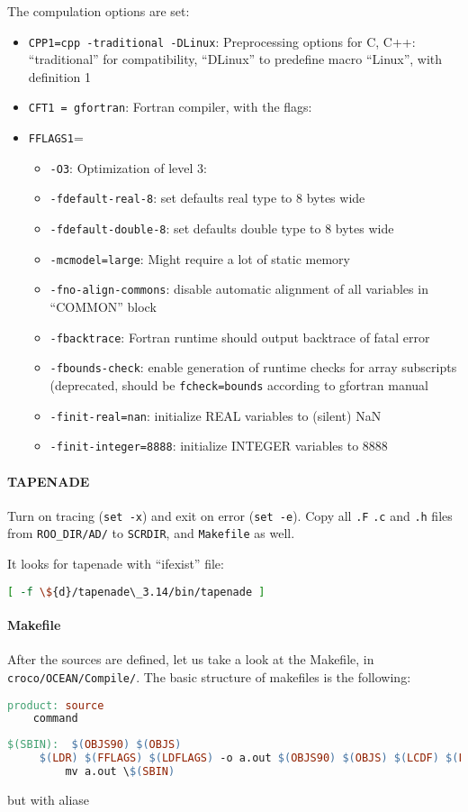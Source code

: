 \message{ !name(croco.tex)}\documentclass{article}
\begin{document}
The compulation options are set:
\begin{itemize}
\item \texttt{CPP1=cpp -traditional -DLinux}: Preprocessing options for C, C++: ``traditional'' for compatibility, ``DLinux'' to predefine macro ``Linux'', with definition 1
\item \texttt{CFT1 = gfortran}: Fortran compiler, with the flags:
\item \texttt{FFLAGS1}=
  \begin{itemize}
  \item \texttt{-O3}: Optimization of level 3:
  \item \texttt{-fdefault-real-8}: set defaults real type to 8 bytes wide
  \item \texttt{-fdefault-double-8}: set defaults double type to 8 bytes wide
  \item \texttt{-mcmodel=large}: Might require a lot of static memory
  \item \texttt{-fno-align-commons}: disable automatic alignment of all variables in ``COMMON'' block
  \item \texttt{-fbacktrace}: Fortran runtime should output backtrace of fatal error
  \item \texttt{-fbounds-check}: enable generation of runtime checks for array subscripts (deprecated, should be \texttt{fcheck=bounds} according to gfortran manual
  \item \texttt{-finit-real=nan}: initialize REAL variables to (silent) NaN
  \item \texttt{-finit-integer=8888}: initialize INTEGER variables to $8888$
  \end{itemize}
\end{itemize}


\paragraph{TAPENADE}
Turn on tracing (\texttt{set -x}) and exit on error (\texttt{set -e}).
Copy all \texttt{.F} \texttt{.c} and \texttt{.h} files from \texttt{ROO\_DIR/AD/} to \texttt{SCRDIR}, and \texttt{Makefile} as well.

It looks for tapenade with ``ifexist'' file:
\begin{lstlisting}[language=bash]
  [ -f \${d}/tapenade\_3.14/bin/tapenade ]
\end{lstlisting}


\paragraph{Makefile}
After the sources are defined, let us take a look at the Makefile, in  \texttt{croco/OCEAN/Compile/}.
The basic structure of makefiles is the following:
\begin{lstlisting}[language=make]
product: source
    command
  \end{lstlisting}
\begin{lstlisting}[language=make]
$(SBIN):  $(OBJS90) $(OBJS)
	 $(LDR) $(FFLAGS) $(LDFLAGS) -o a.out $(OBJS90) $(OBJS) $(LCDF) $(LMPI) 
         mv a.out \$(SBIN)
\end{lstlisting}
but with aliase
\newpage
\end{document}

